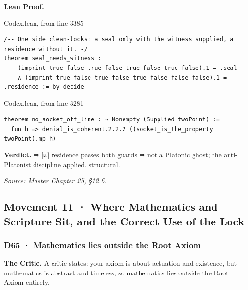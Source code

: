 \documentclass[10pt,twocolumn]{article}
\begin{document}
\textbf{Lean Proof.}

\begin{leanexcerpt}{Codex.lean, from line 3385}
\begin{lstlisting}[style=leanx,firstnumber=3385]
/-- One side clean-locks: a seal only with the witness supplied, a residence without it. -/
theorem seal_needs_witness :
    (imprint true false true false true false true false).1 = .seal
    ∧ (imprint true false true false true false false false).1 = .residence := by decide
\end{lstlisting}
\end{leanexcerpt}

\begin{leanexcerpt}{Codex.lean, from line 3281}
\begin{lstlisting}[style=leanx,firstnumber=3281]
theorem no_socket_off_line : ¬ Nonempty (Supplied twoPoint) :=
  fun h => denial_is_coherent.2.2.2 ((socket_is_the_property twoPoint).mp h)
\end{lstlisting}
\end{leanexcerpt}

\textbf{Verdict.} ⇒ {[}⟀{]} residence passes both guards ⇒ not a
Platonic ghost; the anti-Platonist discipline applied. structural.

\emph{Source: Master Chapter 25, §12.6.}

\hypertarget{movement-11-where-mathematics-and-scripture-sit-and-the-correct-use-of-the-lock}{%
\subsection{Movement 11 · Where Mathematics and Scripture Sit, and the
Correct Use of the
Lock}\label{movement-11-where-mathematics-and-scripture-sit-and-the-correct-use-of-the-lock}}

\hypertarget{d65-mathematics-lies-outside-the-root-axiom}{%
\subsubsection{D65 · Mathematics lies outside the Root
Axiom}\label{d65-mathematics-lies-outside-the-root-axiom}}

\textbf{The Critic.} A critic states: your axiom is about actuation and
existence, but mathematics is abstract and timeless, so mathematics lies
outside the Root Axiom entirely.
\end{document}
